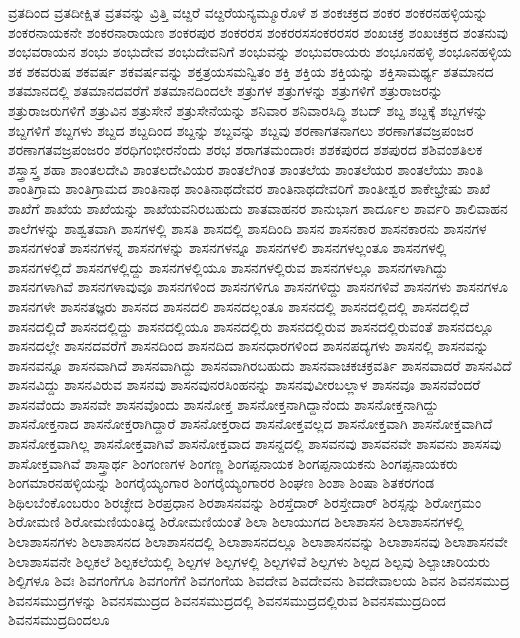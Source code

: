 {ವ್ರತದಿಂದ
ವ್ರತದೀಕ್ಷಿತ
ವ್ರತವನ್ನು
ವ್ರಿತ್ತಿ
ವೞ್ದರೆ
ವೞ್ದರೆಯನ್ಯಮ್ಮೂರೊಳೆ
ಶ
ಶಂಕಚಕ್ರದ
ಶಂಕರ
ಶಂಕರನಹಳ್ಳಿಯನ್ನು
ಶಂಕರನಾಯಕನೇ
ಶಂಕರನಾರಾಯಣ
ಶಂಕರಪುರ
ಶಂಕರರಸ
ಶಂಕರರಸಸಂಕರರಸರ
ಶಂಖಚಕ್ರ
ಶಂಖಚಕ್ರದ
ಶಂತನುವು
ಶಂಭವರಾಯನ
ಶಂಭು
ಶಂಭುದೇವ
ಶಂಭುದೇವನಿಗೆ
ಶಂಭುವನ್ನು
ಶಂಭುವರಾಯರು
ಶಂಭೂನಹಳ್ಳಿ
ಶಂಭೂನಹಳ್ಳಿಯ
ಶಕ
ಶಕವರುಷ
ಶಕವರ್ಷ
ಶಕವರ್ಷವನ್ನು
ಶಕ್ತತ್ರಯಸಮನ್ವಿತಂ
ಶಕ್ತಿ
ಶಕ್ತಿಯ
ಶಕ್ತಿಯನ್ನು
ಶಕ್ತಿಸಾಮರ್ಥ್ಯ
ಶತಮಾನದ
ಶತಮಾನದಲ್ಲಿ
ಶತಮಾನದವರೆಗೆ
ಶತಮಾನದಿಂದಲೇ
ಶತ್ರುಗಳ
ಶತ್ರುಗಳನ್ನು
ಶತ್ರುಗಳಿಗೆ
ಶತ್ರುರಾಜರನ್ನು
ಶತ್ರುರಾಜರುಗಳಿಗೆ
ಶತ್ರುವಿನ
ಶತ್ರುಸೇನೆ
ಶತ್ರುಸೇನೆಯನ್ನು
ಶನಿವಾರ
ಶನಿವಾರಸಿದ್ಧಿ
ಶಬದ್
ಶಬ್ದ
ಶಬ್ದಕ್ಕೆ
ಶಬ್ದಗಳನ್ನು
ಶಬ್ದಗಳಿಗೆ
ಶಬ್ದಗಳು
ಶಬ್ದದ
ಶಬ್ದದಿಂದ
ಶಬ್ದನ್ನು
ಶಬ್ದವನ್ನು
ಶಬ್ದವು
ಶರಣಾಗತನಾಗಲು
ಶರಣಾಗತವಜ್ರಪಂಜರ
ಶರಣಾಗತವಜ್ರಪಂಜರಂ
ಶರಧಿಗಂಭೀರನೆಂದು
ಶರಭ
ಶರಾಗತಮಂದಾರಃ
ಶಶಕಪುರದ
ಶಶಪುರದ
ಶಶಿವಂಶತಿಲಕ
ಶಸ್ತ್ರಾಸ್ತ್ರ
ಶಹಾ
ಶಾಂತಲದೇವಿ
ಶಾಂತಲದೇವಿಯರ
ಶಾಂತಲೆಗಿಂತ
ಶಾಂತಲೆಯ
ಶಾಂತಲೆಯರ
ಶಾಂತಲೆಯು
ಶಾಂತಿ
ಶಾಂತಿಗ್ರಾಮ
ಶಾಂತಿಗ್ರಾಮದ
ಶಾಂತಿನಾಥ
ಶಾಂತಿನಾಥದೇವರ
ಶಾಂತಿನಾಥದೇವರಿಗೆ
ಶಾಂತೀಶ್ವರ
ಶಾಕೇಭ್ರೇಷು
ಶಾಖೆ
ಶಾಖೆಗೆ
ಶಾಖೆಯ
ಶಾಖೆಯನ್ನು
ಶಾಖೆಯವನಿರಬಹುದು
ಶಾತವಾಹನರ
ಶಾನುಭಾಗ
ಶಾರ್ದೂಲ
ಶಾರ್ವರಿ
ಶಾಲಿವಾಹನ
ಶಾಲೆಗಳನ್ನು
ಶಾಶ್ವತವಾಗಿ
ಶಾಸಗಳಲ್ಲಿ
ಶಾಸತಿ
ಶಾಸದಲ್ಲಿ
ಶಾಸದಿಂದಿ
ಶಾಸನ
ಶಾಸನಕಾರ
ಶಾಸನಕಾರನು
ಶಾಸನಗಳ
ಶಾಸನಗಳಂತೆ
ಶಾಸನಗಳನ್ನ
ಶಾಸನಗಳನ್ನು
ಶಾಸನಗಳನ್ನೂ
ಶಾಸನಗಳಲಿ
ಶಾಸನಗಳಲ್ಲಂತೂ
ಶಾಸನಗಳಲ್ಲಿ
ಶಾಸನಗಳಲ್ಲಿದೆ
ಶಾಸನಗಳಲ್ಲಿದ್ದು
ಶಾಸನಗಳಲ್ಲಿಯೂ
ಶಾಸನಗಳಲ್ಲಿರುವ
ಶಾಸನಗಳಲ್ಲೂ
ಶಾಸನಗಳಾಗಿದ್ದು
ಶಾಸನಗಳಾಗಿವೆ
ಶಾಸನಗಳಾವುವೂ
ಶಾಸನಗಳಿಂದ
ಶಾಸನಗಳಿಗೂ
ಶಾಸನಗಳಿದ್ದು
ಶಾಸನಗಳಿವೆ
ಶಾಸನಗಳು
ಶಾಸನಗಳೂ
ಶಾಸನಗಳೇ
ಶಾಸನತಜ್ಞರು
ಶಾಸನದ
ಶಾಸನದಲಿ
ಶಾಸನದಲ್ಲಂತೂ
ಶಾಸನದಲ್ಲಿ
ಶಾಸನದಲ್ಲಿದಲ್ಲಿ
ಶಾಸನದಲ್ಲಿದೆ
ಶಾಸನದಲ್ಲಿದೆೆ
ಶಾಸನದಲ್ಲಿದ್ದು
ಶಾಸನದಲ್ಲಿಯೂ
ಶಾಸನದಲ್ಲಿರು
ಶಾಸನದಲ್ಲಿರುವ
ಶಾಸನದಲ್ಲಿರುವಂತೆ
ಶಾಸನದಲ್ಲೂ
ಶಾಸನದಲ್ಲೇ
ಶಾಸನದವರೆಗೆ
ಶಾಸನದಿಂದ
ಶಾಸನದಿದ
ಶಾಸನಧಾರಗಳಿಂದ
ಶಾಸನಪದ್ಯಗಳು
ಶಾಸನಲ್ಲಿ
ಶಾಸನವನ್ನು
ಶಾಸನವನ್ನೂ
ಶಾಸನವಾಗಿದೆ
ಶಾಸನವಾಗಿದ್ದು
ಶಾಸನವಾಗಿರಬಹುದು
ಶಾಸನವಾಚಕಚಕ್ರವರ್ತಿ
ಶಾಸನವಾದರೆ
ಶಾಸನವಿದೆ
ಶಾಸನವಿದ್ದು
ಶಾಸನವಿರುವ
ಶಾಸನವು
ಶಾಸನವುನರಸಿಂಹನನ್ನು
ಶಾಸನವುವೀರಬಲ್ಲಾಳ
ಶಾಸನವೂ
ಶಾಸನವೆಂದರೆ
ಶಾಸನವೆಂದು
ಶಾಸನವೇ
ಶಾಸನವೊಂದು
ಶಾಸನೋಕ್ತ
ಶಾಸನೋಕ್ತನಾಗಿದ್ದಾನೆಂದು
ಶಾಸನೋಕ್ತನಾಗಿದ್ದು
ಶಾಸನೋಕ್ತನಾದ
ಶಾಸನೋಕ್ತರಾಗಿದ್ದಾರೆ
ಶಾಸನೋಕ್ತರಾದ
ಶಾಸನೋಕ್ತವಲ್ಲದ
ಶಾಸನೋಕ್ತವಾಗಿ
ಶಾಸನೋಕ್ತವಾಗಿದೆ
ಶಾಸನೋಕ್ತವಾಗಿಲ್ಲ
ಶಾಸನೋಕ್ತವಾಗಿವೆ
ಶಾಸನೋಕ್ತವಾದ
ಶಾಸನ್ದದಲ್ಲಿ
ಶಾಸವನವು
ಶಾಸವನವೇ
ಶಾಸವನು
ಶಾಸಸವು
ಶಾಸೋಕ್ತವಾಗಿವೆ
ಶಾಸ್ತ್ರಾರ್ಥ
ಶಿಂಗಂಣಗಳ
ಶಿಂಗಣ್ಣ
ಶಿಂಗಪ್ಪನಾಯಕ
ಶಿಂಗಪ್ಪನಾಯಕನು
ಶಿಂಗಪ್ಪನಾಯಕರು
ಶಿಂಗಮಾರನಹಳ್ಳಿಯನ್ನು
ಶಿಂಗರೈಯ್ಯಂಗಾರ
ಶಿಂಗರೈಯ್ಯಂಗಾರರ
ಶಿಂಘಣ
ಶಿಂಶಾ
ಶಿಂಷಾ
ಶಿತಕರಗಂಡ
ಶಿಥಿಲಬೆಂಕೊಂಬರುಂ
ಶಿರಚ್ಛೇದ
ಶಿರಪ್ರಧಾನ
ಶಿರಶಾಸನವನ್ನು
ಶಿರಸ್ತೆದಾರ್
ಶಿರಸ್ತೇದಾರ್
ಶಿರಸ್ಸನ್ನು
ಶಿರೋಗ್ರಮಂ
ಶಿರೋಮಣಿ
ಶಿರೋಮಣಿಯಂತಿದ್ದ
ಶಿರೋಮಣಿಯಂತೆ
ಶಿಲಾ
ಶಿಲಾಯುಗದ
ಶಿಲಾಶಾಸನ
ಶಿಲಾಶಾಸನಗಳಲ್ಲಿ
ಶಿಲಾಶಾಸನಗಳು
ಶಿಲಾಶಾಸನದ
ಶಿಲಾಶಾಸನದಲ್ಲಿ
ಶಿಲಾಶಾಸನದಲ್ಲೂ
ಶಿಲಾಶಾಸನವನ್ನು
ಶಿಲಾಶಾಸನವು
ಶಿಲಾಶಾಸನವೇ
ಶಿಲಾಶಾಸವನೇ
ಶಿಲ್ಪಕಲೆ
ಶಿಲ್ಪಕಲೆಯಲ್ಲಿ
ಶಿಲ್ಪಗಳ
ಶಿಲ್ಪಗಳಲ್ಲಿ
ಶಿಲ್ಪಗಳಿವೆ
ಶಿಲ್ಪಗಳು
ಶಿಲ್ಪದ
ಶಿಲ್ಪವು
ಶಿಲ್ಪಾಚಾರಿಯರು
ಶಿಲ್ಪಿಗಳೂ
ಶಿವಃ
ಶಿವಗಂಗೆಗೂ
ಶಿವಗಂಗೆಗೆ
ಶಿವಗಂಗೆಯ
ಶಿವದೇವ
ಶಿವದೇವನು
ಶಿವದೇವಾಲಯ
ಶಿವನ
ಶಿವನಸಮುದ್ರ
ಶಿವನಸಮುದ್ರಗಳನ್ನು
ಶಿವನಸಮುದ್ರದ
ಶಿವನಸಮುದ್ರದಲ್ಲಿ
ಶಿವನಸಮುದ್ರದಲ್ಲಿರುವ
ಶಿವನಸಮುದ್ರದಿಂದ
ಶಿವನಸಮುದ್ರದಿಂದಲೂ
}
